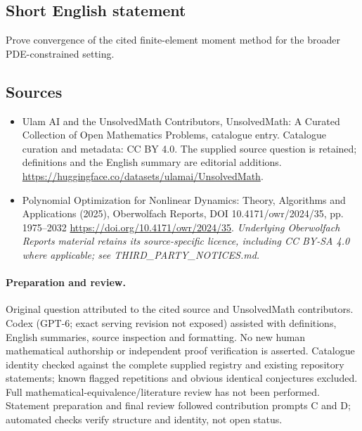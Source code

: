 \documentclass[11pt]{article}
\begin{document}
\subsection{Short English statement}
Prove convergence of the cited finite-element moment method for the broader PDE-constrained setting.
\subsection{Sources}
\begin{itemize}
\item[\hypertarget{source:statement:1}{S1}] Ulam AI and the UnsolvedMath Contributors, UnsolvedMath: A Curated Collection of Open Mathematics Problems, catalogue entry. Catalogue curation and metadata: CC BY 4.0. The supplied source question is retained; definitions and the English summary are editorial additions.
\url{https://huggingface.co/datasets/ulamai/UnsolvedMath}.
\item[\hypertarget{source:statement:2}{S2}] Polynomial Optimization for Nonlinear Dynamics: Theory, Algorithms and Applications (2025), Oberwolfach Reports, DOI 10.4171/owr/2024/35, pp. 1975--2032
\url{https://doi.org/10.4171/owr/2024/35}.
\textit{Underlying Oberwolfach Reports material retains its source-specific licence, including CC BY-SA 4.0 where applicable; see THIRD\_PARTY\_NOTICES.md.}
\end{itemize}
\paragraph{Preparation and review.}
Original question attributed to the cited source and UnsolvedMath contributors. Codex (GPT-6; exact serving revision not exposed) assisted with definitions, English summaries, source inspection and formatting. No new human mathematical authorship or independent proof verification is asserted. Catalogue identity checked against the complete supplied registry and existing repository statements; known flagged repetitions and obvious identical conjectures excluded. Full mathematical-equivalence/literature review has not been performed. Statement preparation and final review followed contribution prompts C and D; automated checks verify structure and identity, not open status.
\label{end:statement}
\end{document}
